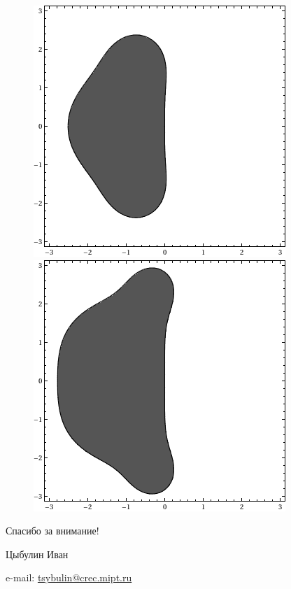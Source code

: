 \documentclass[professionalfonts,compress,unicode,aspectratio=169]{beamer}
\newcommand{\colorhref}[2]{\href{#1}{\textcolor{miptbase!30!black}{#2}}}
\begin{document}
\begin{frame}
\begin{figure}
\includegraphics[height=.4\textheight]{rk3.png}%
\includegraphics[height=.4\textheight]{rk4.png}%
\end{figure}
\end{frame}

\begin{frame}[plain]
  \begin{center}
  {\Huge Спасибо за внимание!}
  \vspace{8ex}

  Цыбулин Иван

  e-mail: \colorhref{mailto:tsybulin@crec.mipt.ru}{tsybulin@crec.mipt.ru}
  \end{center}
\end{frame}
\end{document}
